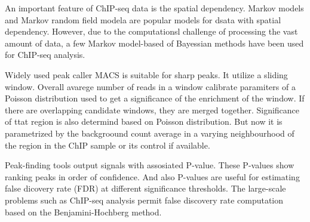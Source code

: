 An important feature of ChIP-seq data is the spatial dependency.
Markov models and Markov random field modela are popular models for dsata with spatial dependency.
However, due to the computationsl challenge of processing the vast amount of data, a few Markov model-based of Bayessian methods have been used for ChIP-seq analysis.



Widely used peak caller MACS is suitable for sharp peaks.
It utilize a sliding window. 
Overall avarege number of reads in a window calibrate paramiters of a Poisson distribution used to get a significance of the enrichment of the window.
If there are overlapping candidate windows, they are merged together.
Significance of ttat region is also determind based on Poisson distribution.
But now it is parametrized by the backgroound count average in a varying neighbourhood of the region in the ChIP sample or its control if available.







Peak-finding tools output signals with assosiated P-value.
These P-values show ranking peaks in order of confidence.
And also P-values are useful for estimating false dicovery rate (FDR) at different significance thresholds.
% 
The large-scale problems such as ChIP-seq analysis permit false discovery rate computation based on the Benjamini-Hochberg method.



